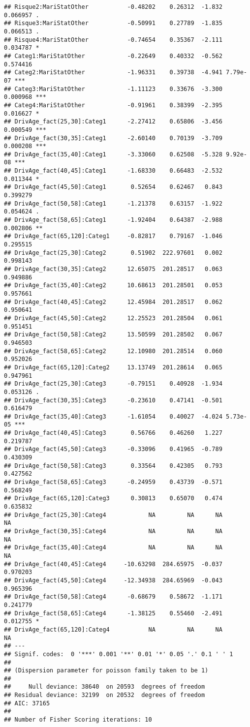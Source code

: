\documentclass[
]{article}
\begin{document}
\begin{verbatim}
## Risque2:MariStatOther           -0.48202    0.26312  -1.832 0.066957 .  
## Risque3:MariStatOther           -0.50991    0.27789  -1.835 0.066513 .  
## Risque4:MariStatOther           -0.74654    0.35367  -2.111 0.034787 *  
## Categ1:MariStatOther            -0.22649    0.40332  -0.562 0.574416    
## Categ2:MariStatOther            -1.96331    0.39738  -4.941 7.79e-07 ***
## Categ3:MariStatOther            -1.11123    0.33676  -3.300 0.000968 ***
## Categ4:MariStatOther            -0.91961    0.38399  -2.395 0.016627 *  
## DrivAge_fact(25,30]:Categ1      -2.27412    0.65806  -3.456 0.000549 ***
## DrivAge_fact(30,35]:Categ1      -2.60140    0.70139  -3.709 0.000208 ***
## DrivAge_fact(35,40]:Categ1      -3.33060    0.62508  -5.328 9.92e-08 ***
## DrivAge_fact(40,45]:Categ1      -1.68330    0.66483  -2.532 0.011344 *  
## DrivAge_fact(45,50]:Categ1       0.52654    0.62467   0.843 0.399279    
## DrivAge_fact(50,58]:Categ1      -1.21378    0.63157  -1.922 0.054624 .  
## DrivAge_fact(58,65]:Categ1      -1.92404    0.64387  -2.988 0.002806 ** 
## DrivAge_fact(65,120]:Categ1     -0.82817    0.79167  -1.046 0.295515    
## DrivAge_fact(25,30]:Categ2       0.51902  222.97601   0.002 0.998143    
## DrivAge_fact(30,35]:Categ2      12.65075  201.28517   0.063 0.949886    
## DrivAge_fact(35,40]:Categ2      10.68613  201.28501   0.053 0.957661    
## DrivAge_fact(40,45]:Categ2      12.45984  201.28517   0.062 0.950641    
## DrivAge_fact(45,50]:Categ2      12.25523  201.28504   0.061 0.951451    
## DrivAge_fact(50,58]:Categ2      13.50599  201.28502   0.067 0.946503    
## DrivAge_fact(58,65]:Categ2      12.10980  201.28514   0.060 0.952026    
## DrivAge_fact(65,120]:Categ2     13.13749  201.28614   0.065 0.947961    
## DrivAge_fact(25,30]:Categ3      -0.79151    0.40928  -1.934 0.053126 .  
## DrivAge_fact(30,35]:Categ3      -0.23610    0.47141  -0.501 0.616479    
## DrivAge_fact(35,40]:Categ3      -1.61054    0.40027  -4.024 5.73e-05 ***
## DrivAge_fact(40,45]:Categ3       0.56766    0.46260   1.227 0.219787    
## DrivAge_fact(45,50]:Categ3      -0.33096    0.41965  -0.789 0.430309    
## DrivAge_fact(50,58]:Categ3       0.33564    0.42305   0.793 0.427562    
## DrivAge_fact(58,65]:Categ3      -0.24959    0.43739  -0.571 0.568249    
## DrivAge_fact(65,120]:Categ3      0.30813    0.65070   0.474 0.635832    
## DrivAge_fact(25,30]:Categ4            NA         NA      NA       NA    
## DrivAge_fact(30,35]:Categ4            NA         NA      NA       NA    
## DrivAge_fact(35,40]:Categ4            NA         NA      NA       NA    
## DrivAge_fact(40,45]:Categ4     -10.63298  284.65975  -0.037 0.970203    
## DrivAge_fact(45,50]:Categ4     -12.34938  284.65969  -0.043 0.965396    
## DrivAge_fact(50,58]:Categ4      -0.68679    0.58672  -1.171 0.241779    
## DrivAge_fact(58,65]:Categ4      -1.38125    0.55460  -2.491 0.012755 *  
## DrivAge_fact(65,120]:Categ4           NA         NA      NA       NA    
## ---
## Signif. codes:  0 '***' 0.001 '**' 0.01 '*' 0.05 '.' 0.1 ' ' 1
## 
## (Dispersion parameter for poisson family taken to be 1)
## 
##     Null deviance: 38640  on 20593  degrees of freedom
## Residual deviance: 32199  on 20532  degrees of freedom
## AIC: 37165
## 
## Number of Fisher Scoring iterations: 10
\end{verbatim}
\end{document}
